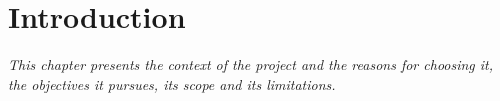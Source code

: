 \chapter{Introduction}
\label{chapter:tongquan}

\textit{This chapter presents the context of the project and the reasons for choosing it, the objectives it pursues, its scope and its limitations.}





